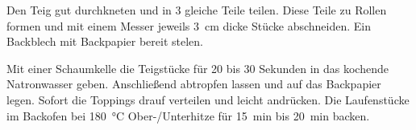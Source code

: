 \begin{recipeDP}
{        \step Den Teig gut durchkneten und in 3 gleiche Teile teilen. 
        Diese Teile zu Rollen formen und mit einem Messer jeweils \SI[]{3}{\centi\meter} dicke Stücke abschneiden.
        Ein Backblech mit Backpapier bereit stelen.

        \step Mit einer Schaumkelle die Teigstücke für 20 bis 30 Sekunden in das kochende Natronwasser geben.
        Anschließend abtropfen lassen und auf das Backpapier legen.
        Sofort die Toppings drauf verteilen und leicht andrücken.
        Die Laufenstücke im Backofen bei \SI{180}{\celsius} Ober-/Unterhitze für \SI{15}{\minute} bis \SI{20}{\minute} backen.
    }



\end{recipeDP}